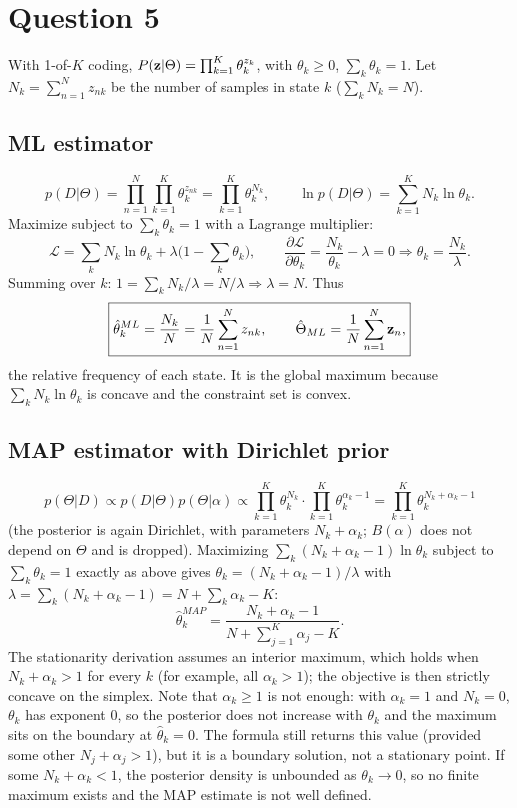 \documentclass[11pt]{article}
\begin{document}
\section*{Question 5}
With 1-of-$K$ coding, $P(\mathbf{z}|\Theta)=\prod_{k=1}^K\theta_k^{z_k}$, with $\theta_k\ge0$, $\sum_k\theta_k=1$. Let $N_k=\sum_{n=1}^Nz_{nk}$ be the number of samples in state $k$ ($\sum_kN_k=N$).

\subsection*{ML estimator}
\[
p(D|\Theta)=\prod_{n=1}^N\prod_{k=1}^K\theta_k^{z_{nk}}=\prod_{k=1}^K\theta_k^{N_k},\qquad
\ln p(D|\Theta)=\sum_{k=1}^KN_k\ln\theta_k .
\]
Maximize subject to $\sum_k\theta_k=1$ with a Lagrange multiplier:
\[
\mathcal L=\sum_kN_k\ln\theta_k+\lambda\Big(1-\sum_k\theta_k\Big),\qquad
\frac{\partial\mathcal L}{\partial\theta_k}=\frac{N_k}{\theta_k}-\lambda=0\Rightarrow\theta_k=\frac{N_k}{\lambda}.
\]
Summing over $k$: $1=\sum_kN_k/\lambda=N/\lambda\Rightarrow\lambda=N$. Thus
\[
\boxed{\hat\theta_k^{ML}=\frac{N_k}{N}=\frac1N\sum_{n=1}^Nz_{nk},\qquad\hat\Theta_{ML}=\frac1N\sum_{n=1}^N\mathbf{z}_n,}
\]
the relative frequency of each state. It is the global maximum because $\sum_kN_k\ln\theta_k$ is concave and the constraint set is convex.

\subsection*{MAP estimator with Dirichlet prior}
\[
p(\Theta|D)\propto p(D|\Theta)p(\Theta|\alpha)\propto\prod_{k=1}^K\theta_k^{N_k}\cdot\prod_{k=1}^K\theta_k^{\alpha_k-1}=\prod_{k=1}^K\theta_k^{N_k+\alpha_k-1}
\]
(the posterior is again Dirichlet, with parameters $N_k+\alpha_k$; $B(\alpha)$ does not depend on $\Theta$ and is dropped). Maximizing $\sum_k(N_k+\alpha_k-1)\ln\theta_k$ subject to $\sum_k\theta_k=1$ exactly as above gives $\theta_k=(N_k+\alpha_k-1)/\lambda$ with $\lambda=\sum_k(N_k+\alpha_k-1)=N+\sum_k\alpha_k-K$:
\[
\boxed{\hat\theta_k^{MAP}=\frac{N_k+\alpha_k-1}{N+\sum_{j=1}^K\alpha_j-K}.}
\]
The stationarity derivation assumes an interior maximum, which holds when $N_k+\alpha_k>1$ for every $k$ (for example, all $\alpha_k>1$); the objective is then strictly concave on the simplex. Note that $\alpha_k\ge1$ is not enough: with $\alpha_k=1$ and $N_k=0$, $\theta_k$ has exponent $0$, so the posterior does not increase with $\theta_k$ and the maximum sits on the boundary at $\hat\theta_k=0$. The formula still returns this value (provided some other $N_j+\alpha_j>1$), but it is a boundary solution, not a stationary point. If some $N_k+\alpha_k<1$, the posterior density is unbounded as $\theta_k\to0$, so no finite maximum exists and the MAP estimate is not well defined.
\end{document}
